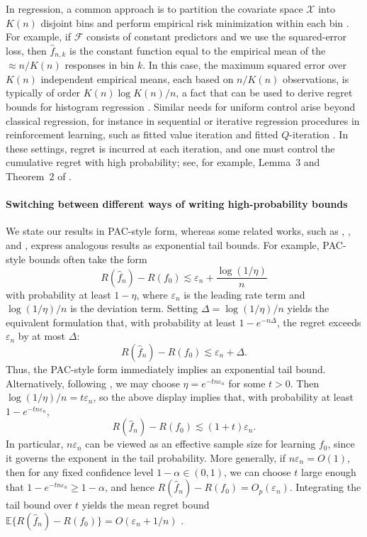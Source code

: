 \documentclass[11pt]{article}
\theoremstyle{plain}
\theoremstyle{definition} %
\begin{document}
In regression, a common approach is to partition the covariate space \(\mathcal X\) into \(K(n)\) disjoint bins and perform empirical risk minimization within each bin \citep{wasserman2006all, takezawa2005introduction}. For example, if \(\mathcal F\) consists of constant predictors and we use the squared-error loss, then \(\hat f_{n,k}\) is the constant function equal to the empirical mean of the \(\approx n/K(n)\) responses in bin \(k\). In this case, the maximum squared error over \(K(n)\) independent empirical means, each based on \(n/K(n)\) observations, is typically of order \(K(n)\log K(n)/n\), a fact that can be used to derive regret bounds for histogram regression \citep{wasserman2006all}. Similar needs for uniform control arise beyond classical regression, for instance in sequential or iterative regression procedures in reinforcement learning, such as fitted value iteration and fitted \(Q\)-iteration \citep{munos2005error, munos2008finite, antos2007fitted, van2025inverse, van2025fitted, van2025stationary}. In these settings, regret is incurred at each iteration, and one must control the cumulative regret with high probability; see, for example, Lemma~3 and Theorem~2 of \citet{van2025fitted}.

\paragraph{Switching between different ways of writing high-probability bounds}
We state our results in PAC-style form, whereas some related works, such as \cite{bousquet2002bennett}, \cite{bartlett2005local}, and \cite{wainwright2019high}, express analogous results as exponential tail bounds. For example, PAC-style bounds often take the form
\[
R(\hat f_n)-R(f_0)\lesssim \varepsilon_n+\frac{\log(1/\eta)}{n}
\]
with probability at least \(1-\eta\), where \(\varepsilon_n\) is the leading rate term and \(\log(1/\eta)/n\) is the deviation term. Setting \(\Delta=\log(1/\eta)/n\) yields the equivalent formulation that, with probability at least \(1-e^{-n\Delta}\), the regret exceeds \(\varepsilon_n\) by at most \(\Delta\):
\[
R(\hat f_n)-R(f_0)\lesssim \varepsilon_n+\Delta.
\]
Thus, the PAC-style form immediately implies an exponential tail bound. Alternatively, following \cite{wainwright2019high}, we may choose \(\eta=e^{-t n\varepsilon_n}\) for some \(t>0\). Then \(\log(1/\eta)/n=t\varepsilon_n\), so the above display implies that, with probability at least \(1-e^{-t n\varepsilon_n}\),
\[
R(\hat f_n)-R(f_0)\lesssim (1+t)\varepsilon_n.
\]
In particular, \(n\varepsilon_n\) can be viewed as an effective sample size for learning \(f_0\), since it governs the exponent in the tail probability. More generally, if \(n\varepsilon_n=O(1)\), then for any fixed confidence level \(1-\alpha\in(0,1)\), we can choose \(t\) large enough that \(1-e^{-t n\varepsilon_n}\ge 1-\alpha\), and hence \(R(\hat f_n)-R(f_0)=O_p(\varepsilon_n)\). Integrating the tail bound over \(t\) yields the mean regret bound \(\mathbb{E}\{R(\hat f_n)-R(f_0)\}=O(\varepsilon_n+1/n)\) \citep{wainwright2019high}.
\end{document}
